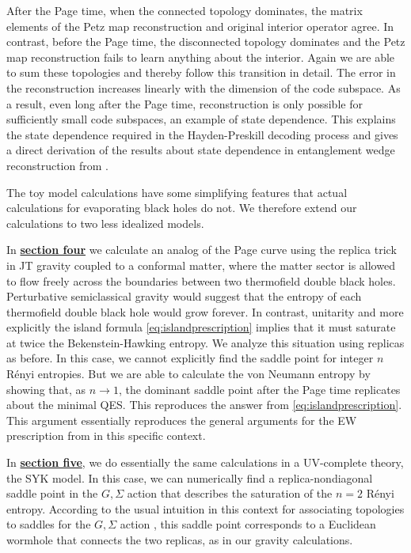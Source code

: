\documentclass[11pt]{article}
\numberwithin{equation}{section}
\begin{document}
After the Page time, when the connected topology dominates,  the matrix elements of the Petz map reconstruction and original interior operator agree. In contrast, before the Page time, the disconnected topology dominates and the Petz map reconstruction fails to learn anything about the interior. Again we are able to sum these topologies and thereby follow this transition in detail. The error in the reconstruction increases linearly with the dimension of the code subspace. As a result, even long after the Page time, reconstruction is only possible for sufficiently small code subspaces, an example of state dependence. This explains the state dependence required in the Hayden-Preskill decoding process \cite{Hayden:2007cs} and gives a direct derivation of the results about state dependence in entanglement wedge reconstruction from \cite{Hayden:2018khn}.



The toy model calculations have some simplifying features that actual calculations for evaporating black holes do not.  We therefore extend our calculations to two less idealized models.  

 In \hyperref[sec:JT]{{\bf section four}} we calculate an analog of the Page curve using the replica trick in JT gravity coupled to a conformal matter, where the matter sector is allowed to flow freely across the boundaries between two thermofield double black holes.   Perturbative semiclassical gravity would suggest that the entropy of each thermofield double black hole would grow forever.   In contrast, unitarity and more explicitly the island formula  \eqref{eq:islandprescription} implies  that it must saturate at twice the Bekenstein-Hawking entropy.  We analyze this situation using replicas as before.   In this case, we cannot explicitly find the saddle point for integer  $n$ R\'{e}nyi entropies.  But we are able to  calculate the von Neumann entropy by showing that, as  $n \to 1$, the dominant saddle point after the Page time replicates about the minimal QES.  This  reproduces the answer from \eqref{eq:islandprescription}. This argument essentially reproduces the general arguments for the EW prescription from \cite{Dong:2017xht} in this specific context.

In \hyperref[sec:SYK]{{\bf section five}}, we do essentially the same calculations in a UV-complete theory, the SYK model. In this case, we can numerically find a replica-nondiagonal saddle point in the $G,\Sigma$ action that describes the saturation of the $n=2$ R\'{e}nyi entropy. According to the usual intuition in this context  for associating topologies to saddles for the  $G,\Sigma$ action
 \cite{Saad:2018bqo}, this saddle point corresponds to a Euclidean wormhole that connects the two replicas, as in our gravity calculations. 
\end{document}
